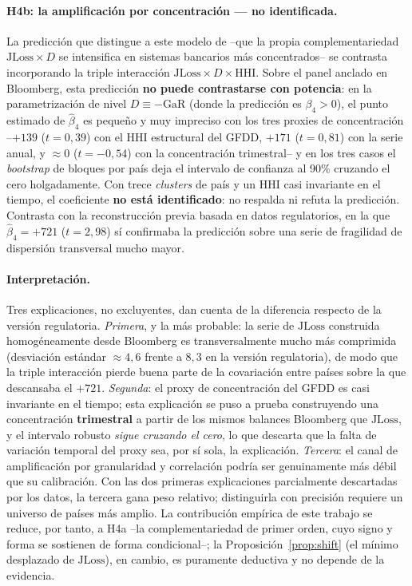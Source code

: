 \documentclass[11pt]{article}
\theoremstyle{plain}
\theoremstyle{definition}
\theoremstyle{remark}
\newcommand{\JLoss}{\mathrm{JLoss}}
\newcommand{\GaR}{\mathrm{GaR}}
\newcommand{\HHI}{\mathrm{HHI}}
\newcommand{\1}{\mathbf{1}}
\begin{document}
\paragraph{H4b: la amplificación por concentración --- no identificada.} La predicción que distingue a este modelo de \citet{MMR2010} --que la propia complementariedad $\JLoss\times D$ se intensifica en sistemas bancarios más concentrados-- se contrasta incorporando la triple interacción $\JLoss\times D\times\HHI$. Sobre el panel anclado en Bloomberg, esta predicción \textbf{no puede contrastarse con potencia}: en la parametrización de nivel $D\equiv-\GaR$ (donde la predicción es $\beta_4>0$), el punto estimado de $\hat\beta_4$ es pequeño y muy impreciso con los tres proxies de concentración --$+139$ ($t=0{,}39$) con el $\HHI$ estructural del GFDD, $+171$ ($t=0{,}81$) con la serie anual, y $\approx 0$ ($t=-0{,}54$) con la concentración trimestral-- y en los tres casos el \textit{bootstrap} de bloques por país deja el intervalo de confianza al 90\% cruzando el cero holgadamente. Con trece \textit{clusters} de país y un $\HHI$ casi invariante en el tiempo, el coeficiente \textbf{no está identificado}: no respalda ni refuta la predicción. Contrasta con la reconstrucción previa basada en datos regulatorios, en la que $\hat\beta_4=+721$ ($t=2{,}98$) sí confirmaba la predicción sobre una serie de fragilidad de dispersión transversal mucho mayor.

\paragraph{Interpretación.} Tres explicaciones, no excluyentes, dan cuenta de la diferencia respecto de la versión regulatoria. \emph{Primera}, y la más probable: la serie de $\JLoss$ construida homogéneamente desde Bloomberg es transversalmente mucho más comprimida (desviación estándar $\approx 4{,}6$ frente a $8{,}3$ en la versión regulatoria), de modo que la triple interacción pierde buena parte de la covariación entre países sobre la que descansaba el $+721$. \emph{Segunda}: el proxy de concentración del GFDD es casi invariante en el tiempo; esta explicación se puso a prueba construyendo una concentración \textbf{trimestral} a partir de los mismos balances Bloomberg que $\JLoss$, y el intervalo robusto \emph{sigue cruzando el cero}, lo que descarta que la falta de variación temporal del proxy sea, por sí sola, la explicación. \emph{Tercera}: el canal de amplificación por granularidad y correlación podría ser genuinamente más débil que su calibración. Con las dos primeras explicaciones parcialmente descartadas por los datos, la tercera gana peso relativo; distinguirla con precisión requiere un universo de países más amplio. La contribución empírica de este trabajo se reduce, por tanto, a H4a --la complementariedad de primer orden, cuyo signo y forma se sostienen de forma condicional--; la Proposición~\ref{prop:shift} (el mínimo desplazado de $\JLoss$), en cambio, es puramente deductiva y no depende de la evidencia.
\end{document}
